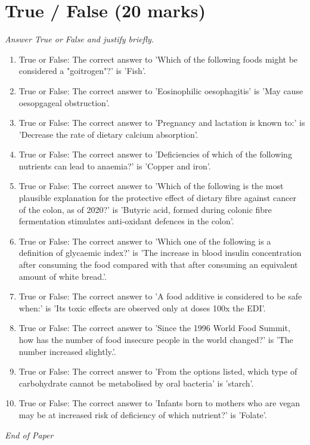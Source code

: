 \documentclass[12pt]{article}
\begin{document}
\section*{True / False (20 marks)}
\textit{Answer True or False and justify briefly.}
\begin{enumerate}[label=\arabic*.]
\item True or False: The correct answer to 'Which of the following foods might be considered a "goitrogen"?' is 'Fish'.
\item True or False: The correct answer to 'Eosinophilic oesophagitis' is 'May cause oesopgageal obstruction'.
\item True or False: The correct answer to 'Pregnancy and lactation is known to:' is 'Decrease the rate of dietary calcium absorption'.
\item True or False: The correct answer to 'Deficiencies of which of the following nutrients can lead to anaemia?' is 'Copper and iron'.
\item True or False: The correct answer to 'Which of the following is the most plausible explanation for the protective effect of dietary fibre against cancer of the colon, as of 2020?' is 'Butyric acid, formed during colonic fibre fermentation stimulates anti-oxidant defences in the colon'.
\item True or False: The correct answer to 'Which one of the following is a definition of glycaemic index?' is 'The increase in blood insulin concentration after consuming the food compared with that after consuming an equivalent amount of white bread.'.
\item True or False: The correct answer to 'A food additive is considered to be safe when:' is 'Its toxic effects are observed only at doses 100x the EDI'.
\item True or False: The correct answer to 'Since the 1996 World Food Summit, how has the number of food insecure people in the world changed?' is 'The number increased slightly.'.
\item True or False: The correct answer to 'From the options listed, which type of carbohydrate cannot be metabolised by oral bacteria' is 'starch'.
\item True or False: The correct answer to 'Infants born to mothers who are vegan may be at increased risk of deficiency of which nutrient?' is 'Folate'.
\end{enumerate}

\vfill
\noindent\textit{End of Paper}
\end{document}
